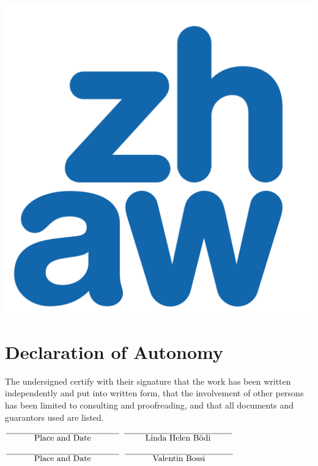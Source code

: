 \documentclass[12pt, a4paper]{report}
\begin{document}
\begin{titlepage}
    \includegraphics[scale=0.05]{Images/logo.png}\\[1cm] 
    
    \vfill 
    
    \end{titlepage}
    
    
    \chapter*{Declaration of Autonomy}
     
     The undersigned certify with their signature that the work has been written independently and put into written form, that the involvement of other persons has been limited to consulting and proofreading, and that all documents and guarantors used are listed.

 \vskip4cm
$\overline{\hbox{\phantom{mmmm}Place and Date\phantom{mmmm}}}$\hskip2cm
$\overline{\hbox{\phantom{mmm}Linda Helen Bödi\phantom{mmm}}}$

\vskip3cm
$\overline{\hbox{\phantom{mmmm}Place and Date\phantom{mmmm}}}$\hskip2cm
$\overline{\hbox{\phantom{mmmm}Valentin Bossi\phantom{mmmm}}}$
\end{document}
